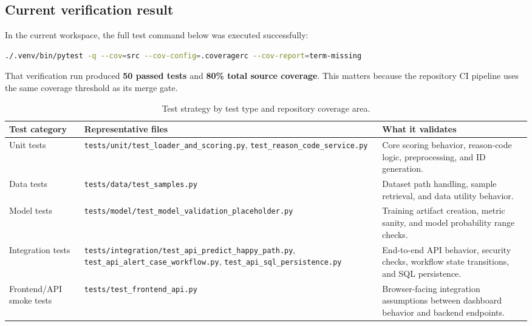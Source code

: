\documentclass[11pt]{article}
\newcommand{\code}[1]{\texttt{#1}}
\newcommand{\status}[1]{\textbf{#1}}
\begin{document}
\subsection*{Current verification result}
In the current workspace, the full test command below was executed successfully:

\begin{lstlisting}[language=bash]
./.venv/bin/pytest -q --cov=src --cov-config=.coveragerc --cov-report=term-missing
\end{lstlisting}

That verification run produced \status{50 passed tests} and \status{80\% total source coverage}. This matters because the repository CI pipeline uses the same coverage threshold as its merge gate.

\begin{table}[H]
\small
\centering
\begin{tabularx}{\textwidth}{p{}p{}X}
\toprule
Test category & Representative files & What it validates \\
\midrule
Unit tests & \code{tests/unit/test\_loader\_and\_scoring.py}, \code{test\_reason\_code\_service.py} & Core scoring behavior, reason-code logic, preprocessing, and ID generation. \\
Data tests & \code{tests/data/test\_samples.py} & Dataset path handling, sample retrieval, and data utility behavior. \\
Model tests & \code{tests/model/test\_model\_validation\_placeholder.py} & Training artifact creation, metric sanity, and model probability range checks. \\
Integration tests & \code{tests/integration/test\_api\_predict\_happy\_path.py}, \code{test\_api\_alert\_case\_workflow.py}, \code{test\_api\_sql\_persistence.py} & End-to-end API behavior, security checks, workflow state transitions, and SQL persistence. \\
Frontend/API smoke tests & \code{tests/test\_frontend\_api.py} & Browser-facing integration assumptions between dashboard behavior and backend endpoints. \\
\bottomrule
\end{tabularx}
\caption{Test strategy by test type and repository coverage area.}
\end{table}
\end{document}

